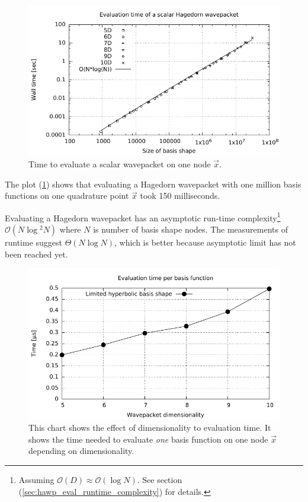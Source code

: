 \documentclass{article}
\begin{document}
\begin{figure}[H]
  \centering
  \includegraphics[width=1.0\textwidth]{plots/hawp_eval_runtime}
  \caption{Time to evaluate a scalar wavepacket on one node \(\vec{x}\).}
  \label{fig:hawp_eval_runtime}
\end{figure}

The plot (\ref{fig:hawp_eval_runtime}) shows that
evaluating a Hagedorn wavepacket with one million basis functions
on one quadrature point \(\vec{x}\) took 150 milliseconds.

Evaluating a Hagedorn wavepacket has an asymptotic run-time
complexity\footnote{Assuming \(\mathcal{O}(D) \approx \mathcal{O}(\log{}N)\).
See section (\ref{sec:hawp_eval_runtime_complexity}) for details.}
\(\mathcal{O}(N \log{}^2N)\)
where \(N\) is number of basis shape nodes. The measurements of runtime suggest \(\Theta(N\log{}N)\),
which is better because asymptotic limit has not been reached yet.

\begin{figure}[H]
  \centering
  \includegraphics[width=1.0\textwidth]{plots/hawp_eval_efficiency}
  \caption{
    This chart shows the effect of dimensionality to evaluation time.
    It shows the time needed to evaluate \emph{one} basis function on one
    node \(\vec{x}\) depending on dimensionality.
  }
  \label{fig:hawp_eval_efficiency}
\end{figure}
\end{document}

